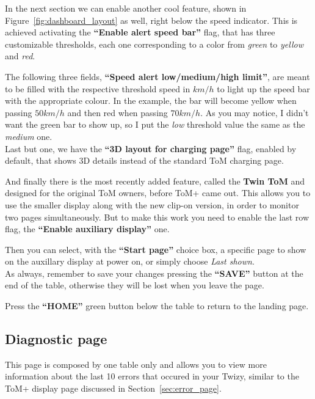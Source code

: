In the next section we can enable another cool feature, shown in Figure~\ref{fig:dashboard_layout}
as well, right below the speed indicator. This is achieved activating the \textbf{“Enable
alert speed bar”} flag, that has three customizable thresholds, each one corresponding
to a color from \textit{green} to \textit{yellow} and \textit{red}.

The following three fields, \textbf{“Speed alert low/medium/high limit”}, are meant
to be filled with the respective threshold speed in $km/h$ to light up the speed bar
with the appropriate colour. In the example, the bar will become yellow when passing
$50 km/h$ and then red when passing $70 km/h$. As you may notice, I didn't want the
green bar to show up, so I put the \textit{low} threshold value the same as the 
\textit{medium} one.\\


Last but one, we have the \textbf{“3D layout for charging page”} flag, enabled by
default, that shows 3D details instead of the standard ToM charging page.

And finally there is the most recently added feature, called the \textbf{Twin ToM}
and designed for the original ToM owners, before ToM+ came out. This allows you to
use the smaller display along with the new clip-on version, in order to monitor
two pages simultaneously. But to make this work you need to enable the last row
flag, the \textbf{“Enable auxiliary display”} one.

Then you can select, with the \textbf{“Start page”} choice box, a specific page to
show on the auxillary display at power on, or simply choose \textit{Last shown}.\\


As always, remember to save your changes pressing the \textbf{“SAVE”} button at the
end of the table, otherwise they will be lost when you leave the page.

Press the \textbf{“HOME”} green button below the table to return to the landing page.

\clearpage

\subsection{Diagnostic page}
\label{sec:web_diagnostic}

This page is composed by one table only and allows you to view more information
about the last 10 errors that occured in your Twizy, similar to the ToM+ display
page discussed in Section~\ref{sec:error_page}.

